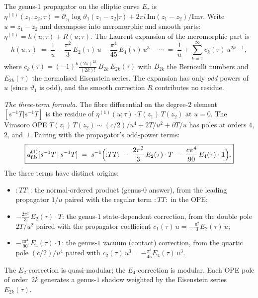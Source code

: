 \begin{computation}
\label{comp:genus1-fibre-diff-TT}%
%
%
The genus-$1$ propagator on the elliptic curve $E_\tau$
is $\eta^{(1)}(z_1,z_2;\tau)
= \partial_{z_1}\log\vartheta_1(z_1-z_2|\tau)
+ 2\pi i\,\mathrm{Im}(z_1-z_2)/\mathrm{Im}\tau$.
Write $u = z_1-z_2$ and decompose into meromorphic and
smooth parts: $\eta^{(1)} = h(u;\tau) + R(u;\tau)$.
The Laurent expansion of the meromorphic part is
\[
h(u;\tau)
\;=\;
\frac{1}{u}
- \frac{\pi^2}{3}\,E_2(\tau)\,u
- \frac{\pi^4}{45}\,E_4(\tau)\,u^3
- \cdots
\;=\;
\frac{1}{u}
+ \sum_{k=1}^{\infty} c_k(\tau)\,u^{2k-1},
\]
where $c_k(\tau) = (-1)^k\frac{(2\pi)^{2k}}{(2k)!}\,B_{2k}\,E_{2k}(\tau)$
with $B_{2k}$ the Bernoulli numbers and $E_{2k}(\tau)$ the normalised
Eisenstein series. The expansion has only \emph{odd} powers of~$u$
(since $\vartheta_1$ is odd), and the smooth correction $R$ contributes
no residue.

\emph{The three-term formula.}
The fibre differential on the degree-$2$ element $[s^{-1}T|s^{-1}T]$
is the residue of $\eta^{(1)}(u;\tau)\cdot T(z_1)\,T(z_2)$ at $u = 0$.
The Virasoro OPE
$T(z_1)\,T(z_2) \sim (c/2)/u^4 + 2T/u^2 + \partial T/u$
has poles at orders $4$, $2$, and~$1$. Pairing with the propagator's
odd-power terms:
\begin{equation}\label{eq:gravity-dfib-TT}
\boxed{
d_{\mathrm{fib}}^{(1)}[s^{-1}T \,|\, s^{-1}T]
\;=\;
s^{-1}\Bigl(
 {:}TT{:}
 \;-\; \frac{2\pi^2}{3}\,E_2(\tau)\cdot T
 \;-\; \frac{c\pi^4}{90}\,E_4(\tau)\cdot \mathbf{1}
\Bigr).
}
\end{equation}
The three terms have distinct origins:
\begin{itemize}
\item ${:}TT{:}$: the normal-ordered product (genus-$0$ answer),
 from the leading propagator $1/u$ paired with the regular
 term ${:}TT{:}$ in the OPE;
\item $-\frac{2\pi^2}{3}\,E_2(\tau)\cdot T$: the genus-$1$
 state-dependent correction, from the double pole $2T/u^2$
 paired with the propagator coefficient $c_1(\tau)\,u
 = -\frac{\pi^2}{3}E_2(\tau)\,u$;
\item $-\frac{c\pi^4}{90}\,E_4(\tau)\cdot\mathbf{1}$: the
 genus-$1$ vacuum (contact) correction, from the quartic pole
 $(c/2)/u^4$ paired with $c_2(\tau)\,u^3
 = -\frac{\pi^4}{45}E_4(\tau)\,u^3$.
\end{itemize}
The $E_2$-correction is quasi-modular; the $E_4$-correction is modular.
Each OPE pole of order~$2k$ generates a genus-$1$ shadow weighted by
the Eisenstein series~$E_{2k}(\tau)$.


\end{computation}
